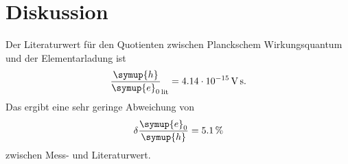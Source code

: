 \section{Diskussion}
\label{sec:Diskussion}

Der Literaturwert für den Quotienten zwischen Planckschem Wirkungsquantum und
der Elementarladung ist
\begin{align}
  \frac{\symup{h}}{\symup{e}_0}_\text{lit} =  \SI{4.14e-15}{\volt\second}.
\end{align}
Das ergibt eine sehr geringe Abweichung von
\begin{align}
  \delta \frac{\symup{e}_0}{\symup{h}} = \SI{5.1}{\percent}
\end{align}
zwischen Mess- und Literaturwert.
